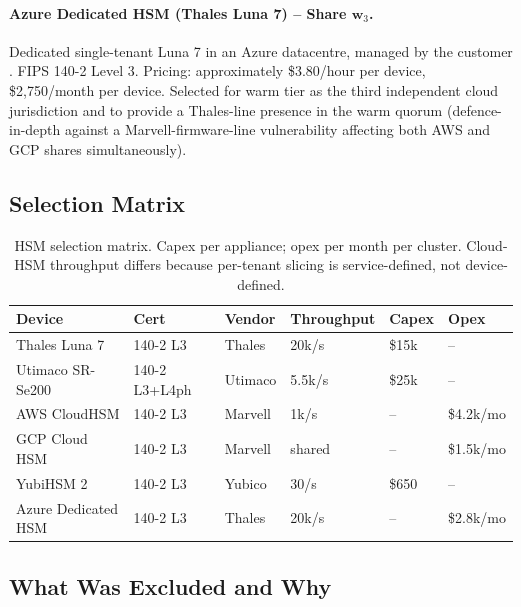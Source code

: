 \paragraph{Azure Dedicated HSM (Thales Luna 7) -- Share $\mathbf{w}_3$.}
Dedicated single-tenant Luna 7 in an Azure datacentre, managed by
the customer \cite{azure-dedicated-hsm}. FIPS 140-2 Level 3.
Pricing: approximately \$3.80/hour per device, \$2{,}750/month per
device. Selected for warm tier as the third independent cloud
jurisdiction and to provide a Thales-line presence in the warm
quorum (defence-in-depth against a Marvell-firmware-line vulnerability
affecting both AWS and GCP shares simultaneously).

\subsection{Selection Matrix}

\begin{table}[h]
\centering
\small
\begin{tabular}{llllll}
\toprule
\textbf{Device} & \textbf{Cert} & \textbf{Vendor} &
\textbf{Throughput} & \textbf{Capex} & \textbf{Opex} \\
\midrule
Thales Luna 7        & 140-2 L3      & Thales  & 20k/s
                     & \$15k & --                              \\
Utimaco SR-Se200     & 140-2 L3+L4ph & Utimaco & 5.5k/s
                     & \$25k & --                              \\
AWS CloudHSM         & 140-2 L3      & Marvell & 1k/s
                     & --     & \$4.2k/mo                       \\
GCP Cloud HSM        & 140-2 L3      & Marvell & shared
                     & --     & \$1.5k/mo                       \\
YubiHSM 2            & 140-2 L3      & Yubico  & 30/s
                     & \$650  & --                              \\
Azure Dedicated HSM  & 140-2 L3      & Thales  & 20k/s
                     & --     & \$2.8k/mo                       \\
\bottomrule
\end{tabular}
\caption{HSM selection matrix. Capex per appliance; opex per
month per cluster. Cloud-HSM throughput differs because per-tenant
slicing is service-defined, not device-defined.}
\label{tab:hsm-matrix}
\end{table}

\subsection{What Was Excluded and Why}

